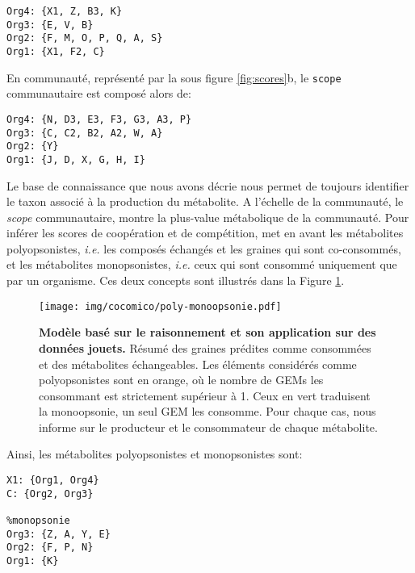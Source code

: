 \documentclass[../main.tex]{subfiles}
\begin{document}
\begin{lstlisting}[mathescape=True,label={lst:individual-scope}, caption={Résultat du scope de chaque taxon},captionpos=b]
Org4: {X1, Z, B3, K}
Org3: {E, V, B}
Org2: {F, M, O, P, Q, A, S}
Org1: {X1, F2, C}
\end{lstlisting}

En communauté, représenté par la sous figure \ref{fig:scores}b, le \texttt{scope} communautaire est composé alors de:
\begin{lstlisting}[mathescape=True,label={lst:individual-scope}, caption={Résultat du scope communautaire},captionpos=b]
% scope metabolique communautaire
Org4: {N, D3, E3, F3, G3, A3, P}
Org3: {C, C2, B2, A2, W, A}
Org2: {Y}
Org1: {J, D, X, G, H, I}
\end{lstlisting}

Le base de connaissance que nous avons décrie nous permet de toujours identifier le taxon associé à la production du métabolite. A l'échelle de la communauté, le \textit{scope} communautaire, montre la plus-value métabolique de la communauté. Pour inférer les scores de coopération et de compétition, \ccmc met en avant les métabolites polyopsonistes, \textit{i.e.} les composés échangés et les graines qui sont co-consommés, et les métabolites monopsonistes, \textit{i.e.} ceux qui sont consommé uniquement que par un organisme. Ces deux concepts sont illustrés dans la Figure \ref{fig:mono-polyopsonie}.

\begin{figure}[H]
    \centering
    \texttt{[image: img/cocomico/poly-monoopsonie.pdf]}
    \caption{\textbf{Modèle basé sur le raisonnement et son application sur des données jouets.}
    Résumé des graines prédites comme consommées et des métabolites échangeables. Les éléments considérés comme polyopsonistes sont en orange, où le nombre de GEMs les consommant est strictement supérieur à 1. Ceux en vert traduisent la monoopsonie, un seul GEM les consomme. Pour chaque cas, \ccmc nous informe sur le producteur et le consommateur de chaque métabolite.}
    \label{fig:mono-polyopsonie}
\end{figure}

Ainsi, les métabolites polyopsonistes et monopsonistes sont:
\begin{lstlisting}[mathescape=True,label={lst:individual-scope}, caption={Métabolites considérés comme limitants (polyopsonie) et ceux non limitants (monopsonie)},captionpos=b]
% polyopsonie
X1: {Org1, Org4}
C: {Org2, Org3}

%monopsonie
Org3: {Z, A, Y, E}
Org2: {F, P, N}
Org1: {K}
\end{lstlisting}
\end{document}
